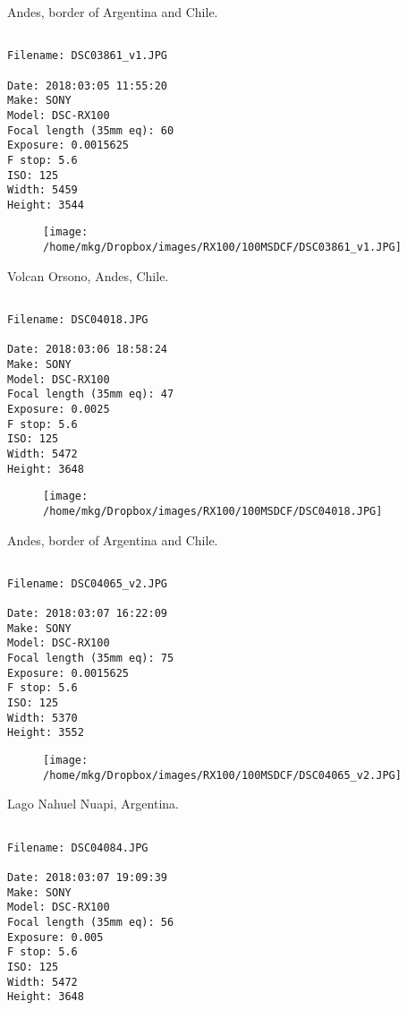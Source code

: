 \clearpage
\onecolumn
\noindent Andes, border of Argentina and Chile.
\noindent
\begin{lstlisting}

Filename: DSC03861_v1.JPG

Date: 2018:03:05 11:55:20
Make: SONY
Model: DSC-RX100
Focal length (35mm eq): 60
Exposure: 0.0015625
F stop: 5.6
ISO: 125
Width: 5459
Height: 3544
\end{lstlisting}
\clearpage

\begin{figure}
\texttt{[image: /home/mkg/Dropbox/images/RX100/100MSDCF/DSC03861\_v1.JPG]}
\end{figure}
    
\clearpage
\onecolumn
\noindent Volcan Orsono, Andes, Chile.
\noindent
\begin{lstlisting}

Filename: DSC04018.JPG

Date: 2018:03:06 18:58:24
Make: SONY
Model: DSC-RX100
Focal length (35mm eq): 47
Exposure: 0.0025
F stop: 5.6
ISO: 125
Width: 5472
Height: 3648
\end{lstlisting}
\clearpage

\begin{figure}
\texttt{[image: /home/mkg/Dropbox/images/RX100/100MSDCF/DSC04018.JPG]}
\end{figure}
    
\clearpage
\onecolumn
\noindent Andes, border of Argentina and Chile.
\noindent
\begin{lstlisting}

Filename: DSC04065_v2.JPG

Date: 2018:03:07 16:22:09
Make: SONY
Model: DSC-RX100
Focal length (35mm eq): 75
Exposure: 0.0015625
F stop: 5.6
ISO: 125
Width: 5370
Height: 3552
\end{lstlisting}
\clearpage

\begin{figure}
\texttt{[image: /home/mkg/Dropbox/images/RX100/100MSDCF/DSC04065\_v2.JPG]}
\end{figure}
    
\clearpage
\onecolumn
\noindent Lago Nahuel Nuapi, Argentina.
\noindent
\begin{lstlisting}

Filename: DSC04084.JPG

Date: 2018:03:07 19:09:39
Make: SONY
Model: DSC-RX100
Focal length (35mm eq): 56
Exposure: 0.005
F stop: 5.6
ISO: 125
Width: 5472
Height: 3648
\end{lstlisting}
\clearpage

